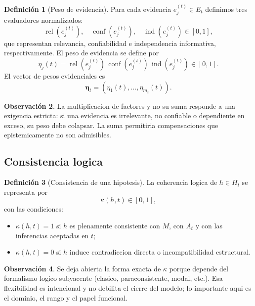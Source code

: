 \documentclass[12pt,a4paper]{article}
\newcommand{\rel}{\operatorname{rel}}
\newcommand{\conf}{\operatorname{conf}}
\newcommand{\ind}{\operatorname{ind}}
\theoremstyle{definition}
\newtheorem{definition}{Definici\'on}[section]
\newtheorem{remark}[definition]{Observaci\'on}
\theoremstyle{plain}
\theoremstyle{remark}
\begin{document}
\begin{definition}[Peso de evidencia]
Para cada evidencia $e_j^{(t)}\in E_t$ definimos tres evaluadores normalizados:
\begin{equation}
\rel(e_j^{(t)}),\quad \conf(e_j^{(t)}),\quad \ind(e_j^{(t)})\in[0,1],
\end{equation}
que representan relevancia, confiabilidad e independencia informativa, respectivamente. El peso de evidencia se define por
\begin{equation}
\eta_j(t)=\rel(e_j^{(t)})\,\conf(e_j^{(t)})\,\ind(e_j^{(t)})\in[0,1].
\end{equation}
El vector de pesos evidenciales es
\begin{equation}
\mathbf{\eta}_t=(\eta_1(t),\dots,\eta_{m_t}(t)).
\end{equation}
\end{definition}

\begin{remark}
La multiplicacion de factores y no su suma responde a una exigencia estricta: si una evidencia es irrelevante, no confiable o dependiente en exceso, su peso debe colapsar. La suma permitiria compensaciones que epistemicamente no son admisibles.
\end{remark}

\subsection{Consistencia logica}

\begin{definition}[Consistencia de una hipotesis]
La coherencia logica de $h\in H_t$ se representa por
\begin{equation}
\kappa(h,t)\in[0,1],
\end{equation}
con las condiciones:
\begin{itemize}[leftmargin=1.4em]
    \item $\kappa(h,t)=1$ si $h$ es plenamente consistente con $M$, con $A_t$ y con las inferencias aceptadas en $t$;
    \item $\kappa(h,t)=0$ si $h$ induce contradiccion directa o incompatibilidad estructural.
\end{itemize}
\end{definition}

\begin{remark}
Se deja abierta la forma exacta de $\kappa$ porque depende del formalismo logico subyacente (clasico, paraconsistente, modal, etc.). Esa flexibilidad es intencional y no debilita el cierre del modelo; lo importante aqui es el dominio, el rango y el papel funcional.
\end{remark}
\end{document}
